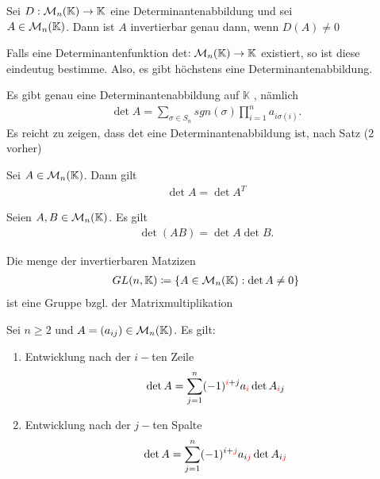 \begin{theorem}
Sei $D:\mathcal{M}_{n}(\mathbb{K}) \to \mathbb{K}$ eine Determinantenabbildung und sei \\ $A \in \mathcal{M}_{n}(\mathbb{K})$. Dann ist $A$ invertierbar genau dann, wenn $D(A) \neq 0$
\end{theorem}

\begin{theorem}
Falls eine Determinantenfunktion det$:\mathcal{M}_{n}(\mathbb{K}) \to \mathbb{K}$ existiert, so ist diese eindeutug bestimme. Also, es gibt höchstens eine Determinantenabbildung.
\end{theorem}

\begin{theorem}
Es gibt genau eine Determinantenabbildung auf $\mathbb{K}$ , nämlich
\begin{align*}
    \det A=\sum_{\sigma\in S_n}sgn(\sigma) \prod_{i=1}^n a_{i\sigma(i)}.
\end{align*}
Es reicht zu zeigen, dass det eine Determinantenabbildung ist, nach Satz (2 vorher)
\end{theorem}

\begin{theorem}
Sei $A\in \mathcal{M}_{n}(\mathbb{K})$. Dann gilt 
\begin{align*}
    \det A=\det A^T
\end{align*}
\end{theorem}

\begin{theorem}
Seien $A,B\in \mathcal{M}_{n}(\mathbb{K})$. Es gilt
\begin{align*}
    \det(AB)=\det A \det B.
\end{align*}
\end{theorem}

\begin{theorem}
Die menge der invertierbaren Matzizen
\begin{align*}
    GL(n,\mathbb{K}) \coloneqq \{A\in \mathcal{M}_{n}(\mathbb{K}) : \det A \neq 0\}
\end{align*}
ist eine Gruppe bzgl. der Matrixmultiplikation
\end{theorem}

\begin{theorem}
Sei $n\geq 2$ und $A=(a_{ij}) \in \mathcal{M}_{n}(\mathbb{K})$. Es gilt:
\begin{enumerate}
    \item Entwicklung nach der $i-$ten Zeile
    \begin{align*}
        \det A = \sum_{j=1}^n (-1)^{\textcolor{red}{i}+j}a_{\textcolor{red}{i}}\det A_{\textcolor{red}{i}j}
    \end{align*}
    \item Entwicklung nach der $j-$ten Spalte
    \begin{align*}
        \det A = \sum_{j=1}^n (-1)^{i+\textcolor{red}{j}}a_{i\textcolor{red}{j}}\det A_{i\textcolor{red}{j}}
    \end{align*}
\end{enumerate}
\end{theorem}